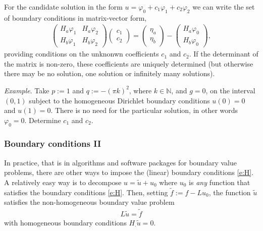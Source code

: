 \documentclass[12pt,a4paper]{article}
\newcommand{\IN}{\mathbb{N}}
\begin{document}
    For the candidate solution in the form
    $u = \varphi_0 + c_1 \varphi_1 + c_2 \varphi_2$
    we can write the set of 
    boundary conditions in matrix-vector form,
    \begin{align}
        \begin{pmatrix}
            H_a \varphi_1 & H_a \varphi_2
            \\
            H_b \varphi_1 & H_b \varphi_2
        \end{pmatrix}
        \begin{pmatrix}
            c_1 \\ c_2
        \end{pmatrix}
        =
        \begin{pmatrix}
            \eta_a \\ \eta_b
        \end{pmatrix}
        -
        \begin{pmatrix}
            H_a \varphi_0 \\ H_b \varphi_0
        \end{pmatrix}
        ,
    \end{align}
    providing conditions 
    on the unknonwn coefficients $c_1$ and $c_2$.
    If the determinant of the matrix is non-zero,
    these coefficients are uniquely determined
    (but otherwise there may be no solution, one solution or infinitely many solutions).
    
    
    \emph{Example}.
    Take 
    $p := 1$ and $q := -(\pi k)^2$,
    where $k \in \IN$,
    and $g = 0$,
    on the interval $(0, 1)$
    subject to 
    the homogeneous Dirichlet boundary conditions
    $u(0) = 0$
    and
    $u(1) = 0$.
    There is no need for the particular solution,
    in other words $\varphi_0 = 0$.
    Determine $c_1$ and $c_2$.
    
    
    
    \subsubsection*{Boundary conditions II}
    
    In practice,
    that is in algorithms and software packages
    for boundary value problems,
    there are other ways to impose 
    the (linear) boundary conditions \eqref{e:H}.
    A relatively easy way is to 
    decompose $u = \tilde{u} + u_0$
    where
    $u_0$ is
    \emph{any} function that satisfies
    the boundary conditions \eqref{e:H}.
    Then,
    setting 
    $\tilde{f} := f - L u_0$,
    the function $\tilde{u}$
    satisfies
    the non-homogeneous boundary value problem
    \begin{align}
        L \tilde{u} = \tilde{f}
    \end{align}
    with homogeneous boundary conditions
    $H_{\cdot} \tilde{u} = 0$.
    
\end{document}
